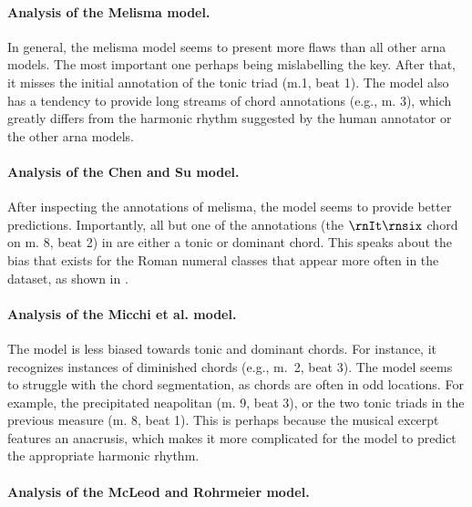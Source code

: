 \paragraph{Analysis of the Melisma model.}

In general, the \gls{melisma} model seems to present more
flaws than all other \gls{arna} models. The most important
one perhaps being mislabelling the key. After that, it
misses the initial annotation of the tonic triad (m.1, beat
1). The model also has a tendency to provide long streams of
chord annotations (e.g., m. 3), which greatly differs from
the harmonic rhythm suggested by the human annotator or the
other \gls{arna} models. 

\paragraph{Analysis of the Chen and Su model.}

After inspecting the annotations of \gls{melisma}, the
\textcite{chen2021attend} model seems to provide better
predictions. Importantly, all but one of the annotations
(the $\rnIt\rnsix$ chord on m. 8, beat 2) in
\textcite{chen2021attend} are either a tonic or dominant
chord. This speaks about the bias that exists for the Roman
numeral classes that appear more often in the dataset, as
shown in . 

\paragraph{Analysis of the Micchi et al. model.}

The \textcite{micchi2021deep} model is less biased towards
tonic and dominant chords. For instance, it recognizes
instances of diminished chords (e.g., m.~2, beat 3). The
model seems to struggle with the chord segmentation, as
chords are often in odd locations. For example, the
precipitated \gls{neapolitan} (m. 9, beat 3), or the two
tonic triads in the previous measure (m. 8, beat 1). This is
perhaps because the musical excerpt features an anacrusis,
which makes it more complicated for the model to predict the
appropriate harmonic rhythm. 

\paragraph{Analysis of the McLeod and Rohrmeier model.}

